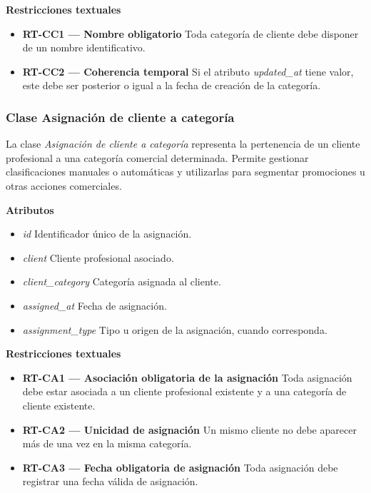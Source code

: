\textbf{Restricciones textuales}

\begin{itemize}

      \item \textbf{RT-CC1 — Nombre obligatorio}
            Toda categoría de cliente debe disponer de un nombre identificativo.
      \item \textbf{RT-CC2 — Coherencia temporal}
            Si el atributo \textit{updated\_at} tiene valor, este debe ser posterior o igual a la fecha de creación de la categoría.

\end{itemize}

\subsubsection{Clase Asignación de cliente a categoría}

La clase \textit{Asignación de cliente a categoría} representa la pertenencia de un cliente profesional a una categoría comercial determinada. Permite gestionar clasificaciones manuales o automáticas y utilizarlas para segmentar promociones u otras acciones comerciales.

\textbf{Atributos}

\begin{itemize}

      \item \textit{id}
            Identificador único de la asignación.
      \item \textit{client}
            Cliente profesional asociado.
      \item \textit{client\_category}
            Categoría asignada al cliente.
      \item \textit{assigned\_at}
            Fecha de asignación.
      \item \textit{assignment\_type}
            Tipo u origen de la asignación, cuando corresponda.

\end{itemize}

\textbf{Restricciones textuales}

\begin{itemize}

      \item \textbf{RT-CA1 — Asociación obligatoria de la asignación}
            Toda asignación debe estar asociada a un cliente profesional existente y a una categoría de cliente existente.
      \item \textbf{RT-CA2 — Unicidad de asignación}
            Un mismo cliente no debe aparecer más de una vez en la misma categoría.
      \item \textbf{RT-CA3 — Fecha obligatoria de asignación}
            Toda asignación debe registrar una fecha válida de asignación.

\end{itemize}

